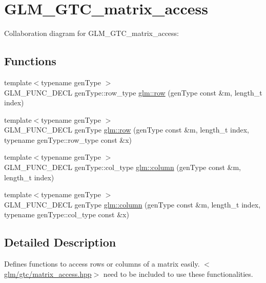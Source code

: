 \hypertarget{group__gtc__matrix__access}{\section{G\-L\-M\-\_\-\-G\-T\-C\-\_\-matrix\-\_\-access}
\label{group__gtc__matrix__access}
}
Collaboration diagram for G\-L\-M\-\_\-\-G\-T\-C\-\_\-matrix\-\_\-access\-:
\subsection*{Functions}
\begin{DoxyCompactItemize}
\item 
{\footnotesize template$<$typename gen\-Type $>$ }\\G\-L\-M\-\_\-\-F\-U\-N\-C\-\_\-\-D\-E\-C\-L gen\-Type\-::row\-\_\-type \hyperlink{group__gtc__matrix__access_ga259e5ebd0f31ec3f83440f8cae7f5dba}{glm\-::row} (gen\-Type const \&m, length\-\_\-t index)
\item 
{\footnotesize template$<$typename gen\-Type $>$ }\\G\-L\-M\-\_\-\-F\-U\-N\-C\-\_\-\-D\-E\-C\-L gen\-Type \hyperlink{group__gtc__matrix__access_gaadcc64829aadf4103477679e48c7594f}{glm\-::row} (gen\-Type const \&m, length\-\_\-t index, typename gen\-Type\-::row\-\_\-type const \&x)
\item 
{\footnotesize template$<$typename gen\-Type $>$ }\\G\-L\-M\-\_\-\-F\-U\-N\-C\-\_\-\-D\-E\-C\-L gen\-Type\-::col\-\_\-type \hyperlink{group__gtc__matrix__access_ga96022eb0d3fae39d89fc7a954e59b374}{glm\-::column} (gen\-Type const \&m, length\-\_\-t index)
\item 
{\footnotesize template$<$typename gen\-Type $>$ }\\G\-L\-M\-\_\-\-F\-U\-N\-C\-\_\-\-D\-E\-C\-L gen\-Type \hyperlink{group__gtc__matrix__access_ga9e757377523890e8b80c5843dbe4dd15}{glm\-::column} (gen\-Type const \&m, length\-\_\-t index, typename gen\-Type\-::col\-\_\-type const \&x)
\end{DoxyCompactItemize}


\subsection{Detailed Description}
Defines functions to access rows or columns of a matrix easily. $<$\hyperlink{matrix__access_8hpp}{glm/gtc/matrix\-\_\-access.\-hpp}$>$ need to be included to use these functionalities. 

